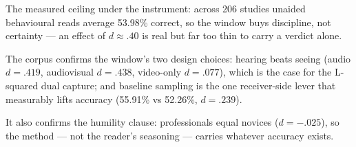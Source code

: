 

\begin{distilled}
  \item The measured ceiling under the instrument: across 206 studies unaided behavioural reads average 53.98\% correct, so the window buys discipline, not certainty --- an effect of $d \approx .40$ is real but far too thin to carry a verdict alone.
  \item The corpus confirms the window's two design choices: hearing beats seeing (audio $d = .419$, audiovisual $d = .438$, video-only $d = .077$), which is the case for the L-squared dual capture; and baseline sampling is the one receiver-side lever that measurably lifts accuracy (55.91\% vs 52.26\%, $d = .239$).
  \item It also confirms the humility clause: professionals equal novices ($d = -.025$), so the method --- not the reader's seasoning --- carries whatever accuracy exists.
\end{distilled}

